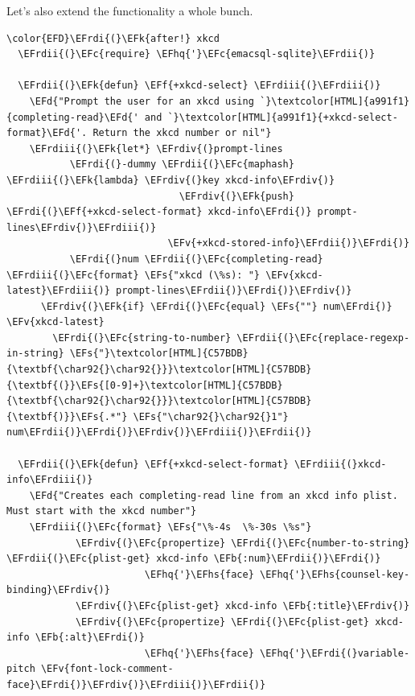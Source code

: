 \documentclass{scrartcl}
\newcommand{\EFk}[1]{\textcolor{EFk}{#1}} %
\newcommand{\EFd}[1]{\textcolor{EFd}{#1}} %
\newcommand{\EFs}[1]{\textcolor{EFs}{#1}} %
\newcommand{\EFb}[1]{\textcolor{EFb}{#1}} %
\newcommand{\EFc}[1]{\textcolor{EFc}{#1}} %
\newcommand{\EFv}[1]{\textcolor{EFv}{#1}} %
\newcommand{\EFf}[1]{\textcolor{EFf}{#1}} %
\newcommand{\EFhq}[1]{#1} %
\newcommand{\EFhs}[1]{#1} %
\newcommand{\EFrdi}[1]{#1} %
\newcommand{\EFrdii}[1]{#1} %
\newcommand{\EFrdiii}[1]{#1} %
\newcommand{\EFrdiv}[1]{#1} %
\begin{document}
Let's also extend the functionality a whole bunch.
\begin{Code}
\begin{Verbatim}[]
\color{EFD}\EFrdi{(}\EFk{after!} xkcd
  \EFrdii{(}\EFc{require} \EFhq{'}\EFc{emacsql-sqlite}\EFrdii{)}

  \EFrdii{(}\EFk{defun} \EFf{+xkcd-select} \EFrdiii{(}\EFrdiii{)}
    \EFd{"Prompt the user for an xkcd using `}\textcolor[HTML]{a991f1}{completing-read}\EFd{' and `}\textcolor[HTML]{a991f1}{+xkcd-select-format}\EFd{'. Return the xkcd number or nil"}
    \EFrdiii{(}\EFk{let*} \EFrdiv{(}prompt-lines
           \EFrdi{(}-dummy \EFrdii{(}\EFc{maphash} \EFrdiii{(}\EFk{lambda} \EFrdiv{(}key xkcd-info\EFrdiv{)}
                              \EFrdiv{(}\EFk{push} \EFrdi{(}\EFf{+xkcd-select-format} xkcd-info\EFrdi{)} prompt-lines\EFrdiv{)}\EFrdiii{)}
                            \EFv{+xkcd-stored-info}\EFrdii{)}\EFrdi{)}
           \EFrdi{(}num \EFrdii{(}\EFc{completing-read} \EFrdiii{(}\EFc{format} \EFs{"xkcd (\%s): "} \EFv{xkcd-latest}\EFrdiii{)} prompt-lines\EFrdii{)}\EFrdi{)}\EFrdiv{)}
      \EFrdiv{(}\EFk{if} \EFrdi{(}\EFc{equal} \EFs{""} num\EFrdi{)} \EFv{xkcd-latest}
        \EFrdi{(}\EFc{string-to-number} \EFrdii{(}\EFc{replace-regexp-in-string} \EFs{"}\textcolor[HTML]{C57BDB}{\textbf{\char92{}\char92{}}}\textcolor[HTML]{C57BDB}{\textbf{(}}\EFs{[0-9]+}\textcolor[HTML]{C57BDB}{\textbf{\char92{}\char92{}}}\textcolor[HTML]{C57BDB}{\textbf{)}}\EFs{.*"} \EFs{"\char92{}\char92{}1"} num\EFrdii{)}\EFrdi{)}\EFrdiv{)}\EFrdiii{)}\EFrdii{)}

  \EFrdii{(}\EFk{defun} \EFf{+xkcd-select-format} \EFrdiii{(}xkcd-info\EFrdiii{)}
    \EFd{"Creates each completing-read line from an xkcd info plist. Must start with the xkcd number"}
    \EFrdiii{(}\EFc{format} \EFs{"\%-4s  \%-30s \%s"}
            \EFrdiv{(}\EFc{propertize} \EFrdi{(}\EFc{number-to-string} \EFrdii{(}\EFc{plist-get} xkcd-info \EFb{:num}\EFrdii{)}\EFrdi{)}
                        \EFhq{'}\EFhs{face} \EFhq{'}\EFhs{counsel-key-binding}\EFrdiv{)}
            \EFrdiv{(}\EFc{plist-get} xkcd-info \EFb{:title}\EFrdiv{)}
            \EFrdiv{(}\EFc{propertize} \EFrdi{(}\EFc{plist-get} xkcd-info \EFb{:alt}\EFrdi{)}
                        \EFhq{'}\EFhs{face} \EFhq{'}\EFrdi{(}variable-pitch \EFv{font-lock-comment-face}\EFrdi{)}\EFrdiv{)}\EFrdiii{)}\EFrdii{)}


\end{Verbatim}
\end{Code}
\end{document}
